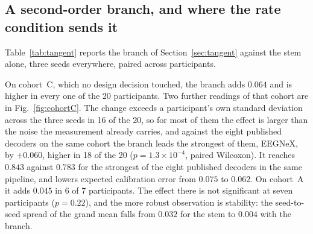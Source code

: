 \documentclass[a4paper,fleqn]{cas-dc}
\begin{document}
\subsection{A second-order branch, and where the rate condition sends it}
\label{sec:tanres}

Table~\ref{tab:tangent} reports the branch of Section~\ref{sec:tangent} against the stem alone, three seeds everywhere, paired across participants.

\begin{table}[t]
\centering
\caption{The tangent-space branch against the convolutional stem, three seeds, two-sided paired Wilcoxon across participants; $\pm$ is the SD across seeds. Cohort~C was held out from architecture and pipeline development. Cohort~B is shown at the default adaptation rate, whose 160-window memory is shorter than its 214-window class blocks, and at a memory of 3200 windows, which is far longer than them.}
\label{tab:tangent}
\end{table}

On cohort~C, which no design decision touched, the branch adds $0.064$ and is higher in every one of the 20 participants. Two further readings of that cohort are in Fig.~\ref{fig:cohortC}. The change exceeds a participant's own standard deviation across the three seeds in 16 of the 20, so for most of them the effect is larger than the noise the measurement already carries, and against the eight published decoders on the same cohort the branch leads the strongest of them, EEGNeX, by $+0.060$, higher in 18 of the 20 ($p=1.3\times10^{-4}$, paired Wilcoxon). It reaches $0.843$ against $0.783$ for the strongest of the eight published decoders in the same pipeline, and lowers expected calibration error from $0.075$ to $0.062$. On cohort~A it adds $0.045$ in 6 of 7 participants. The effect there is not significant at seven participants ($p=0.22$), and the more robust observation is stability: the seed-to-seed spread of the grand mean falls from $0.032$ for the stem to $0.004$ with the branch.
\end{document}
